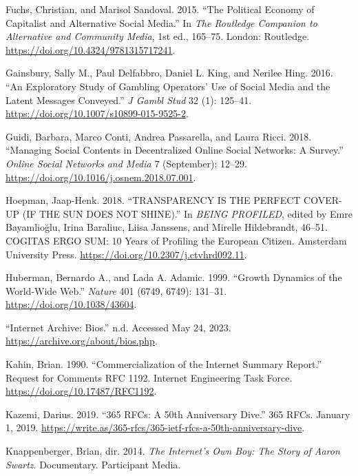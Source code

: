 \documentclass[
  a4paper,
]{book}
\newlength{\cslhangindent}
\newlength{\cslentryspacingunit} %
\newenvironment{CSLReferences}[2] %
 {%
  \setlength{\parindent}{0pt}
  \ifodd #1
  \let\oldpar\par
  \def\par{\hangindent=\cslhangindent\oldpar}
  \fi
  \setlength{\parskip}{#2\cslentryspacingunit}
 }%
 {}
\begin{document}
\begin{CSLReferences}{1}{0}
\hypertarget{ref-fuchsPoliticalEconomyCapitalist2015}{}
Fuchs, Christian, and Marisol Sandoval. 2015. {``The {Political Economy} of {Capitalist} and {Alternative Social Media}.''} In \emph{The {Routledge Companion} to {Alternative} and {Community Media}}, 1st ed., 165--75. {London}: {Routledge}. \url{https://doi.org/10.4324/9781315717241}.

\hypertarget{ref-gainsburyExploratoryStudyGambling2016}{}
Gainsbury, Sally M., Paul Delfabbro, Daniel L. King, and Nerilee Hing. 2016. {``An {Exploratory Study} of {Gambling Operators}' {Use} of {Social Media} and the {Latent Messages Conveyed}.''} \emph{J Gambl Stud} 32 (1): 125--41. \url{https://doi.org/10.1007/s10899-015-9525-2}.

\hypertarget{ref-guidiManagingSocialContents2018}{}
Guidi, Barbara, Marco Conti, Andrea Passarella, and Laura Ricci. 2018. {``Managing Social Contents in {Decentralized Online Social Networks}: {A} Survey.''} \emph{Online Social Networks and Media} 7 (September): 12--29. \url{https://doi.org/10.1016/j.osnem.2018.07.001}.

\hypertarget{ref-hoepmanTRANSPARENCYPERFECTCOVERUP2018}{}
Hoepman, Jaap-Henk. 2018. {``{TRANSPARENCY IS THE PERFECT COVER-UP} ({IF THE SUN DOES NOT SHINE}).''} In \emph{{BEING PROFILED}}, edited by Emre Bayamlioğlu, Irina Baraliuc, Liisa Janssens, and Mirelle Hildebrandt, 46--51. {COGITAS ERGO SUM}: 10 {Years} of {Profiling} the {European Citizen}. {Amsterdam University Press}. \url{https://doi.org/10.2307/j.ctvhrd092.11}.

\hypertarget{ref-hubermanGrowthDynamicsWorldWide1999}{}
Huberman, Bernardo A., and Lada A. Adamic. 1999. {``Growth Dynamics of the {World-Wide Web}.''} \emph{Nature} 401 (6749, 6749): 131--31. \url{https://doi.org/10.1038/43604}.

\hypertarget{ref-InternetArchiveBios}{}
{``Internet {Archive}: {Bios}.''} n.d. Accessed May 24, 2023. \url{https://archive.org/about/bios.php}.

\hypertarget{ref-kahinCommercializationInternetSummary1990}{}
Kahin, Brian. 1990. {``Commercialization of the {Internet} Summary Report.''} Request for Comments RFC 1192. {Internet Engineering Task Force}. \url{https://doi.org/10.17487/RFC1192}.

\hypertarget{ref-kazemiRFCs}{}
Kazemi, Darius. 2019. {``365 {RFCs}: A 50th Anniversary Dive.''} {365 RFCs}. January 1, 2019. \url{https://write.as/365-rfcs/365-ietf-rfcs-a-50th-anniversary-dive}.

\hypertarget{ref-knappenbergerInternetOwnBoy2014}{}
Knappenberger, Brian, dir. 2014. \emph{The {Internet}'s {Own Boy}: {The Story} of {Aaron Swartz}}. Documentary. {Participant Media}.


\end{CSLReferences}
\end{document}
